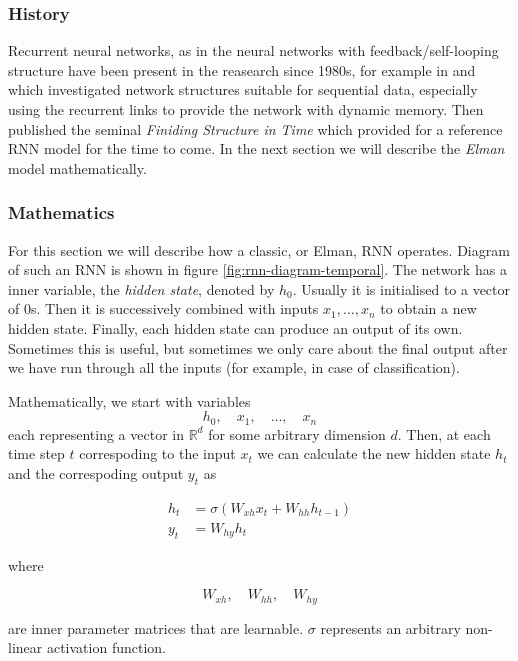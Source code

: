 \subsubsection*{History}
Recurrent neural networks, as in the neural networks with feedback/self-looping structure have been present in the reasearch since 1980s, for example in \cite{rumelhartLearningInternalRepresentations1985} and \cite{jordanSerialOrderParallel1986} which investigated network structures suitable for sequential data, especially using the recurrent links to provide the network with dynamic memory. Then \cite{elmanFindingStructureTime1990} published the seminal \textit{Finiding Structure in Time} which provided for a reference RNN model for the time to come. In the next section we will describe the \textit{Elman} model mathematically.

\subsubsection*{Mathematics}
For this section we will describe how a classic, or Elman, RNN operates. Diagram of such an RNN is shown in figure \ref{fig:rnn-diagram-temporal}. The network has a inner variable, the \textit{hidden state}, denoted by $h_0$. Usually it is initialised to a vector of $0$s. Then it is successively combined with inputs $x_1,\dots,x_n$ to obtain a new hidden state. Finally, each hidden state can produce an output of its own. Sometimes this is useful, but sometimes we only care about the final output after we have run through all the inputs (for example, in case of classification).

Mathematically, we start with variables
$$ h_0,\quad x_1, \quad \dots, \quad x_n $$
each representing a vector in $\mathbb{R}^d$ for some arbitrary dimension $d$. Then, at each time step $t$ correspoding to the input $x_t$ we can calculate the new hidden state $h_t$ and the correspoding output $y_t$ as

\begin{align}
    h_t &= \sigma\left(W_{xh}x_t + W_{hh}h_{t-1}\right) \\
    y_t &= W_{hy}h_t
\end{align}

where

$$ W_{xh}, \quad W_{hh}, \quad W_{hy} $$

are inner parameter matrices that are learnable. $\sigma$ represents an arbitrary non-linear activation function.

